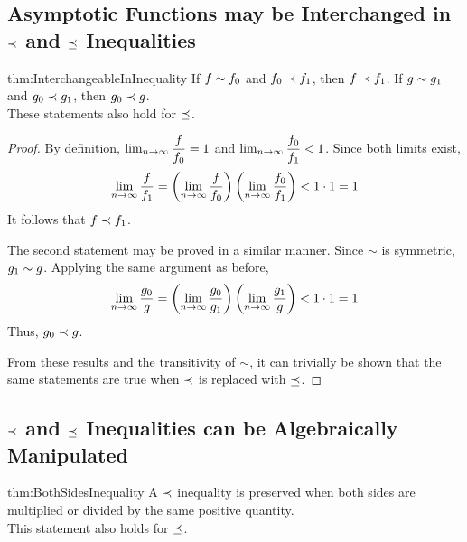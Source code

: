 \subsection{Asymptotic Functions may be Interchanged in $\prec$ and $\preceq$ Inequalities}

\begin{reptheorem}{thm:InterchangeableInInequality}
	If $f \sim f_0$ and $f_0 \prec f_1$, then $f \prec f_1$. If $g \sim g_1$ and $g_0 \prec g_1$, then $g_0 \prec g$.\\
	These statements also hold for $\preceq$.
\end{reptheorem}

\begin{proof}
	By definition, $\lim_{n \to \infty} \dfrac{f}{f_0} = 1$ and $\lim_{n \to \infty} \dfrac{f_0}{f_1} < 1$. Since both limits exist,
	\begin{align*}
	\lim_{n \to \infty} \frac{f}{f_1} = \left( \lim_{n \to \infty} \frac{f}{f_0} \right) \left( \lim_{n \to \infty} \frac{f_0}{f_1} \right) < 1 \cdot 1 = 1
	\end{align*}
	It follows that $f \prec f_1$.
	
	The second statement may be proved in a similar manner. Since $\sim$ is symmetric, $g_1 \sim g$. Applying the same argument as before,
	\begin{align*}
	\lim_{n \to \infty} \frac{g_0}{g} = \left( \lim_{n \to \infty} \frac{g_0}{g_1} \right) \left( \lim_{n \to \infty} \frac{g_1}{g} \right) < 1 \cdot 1 = 1
	\end{align*}
	Thus, $g_0 \prec g$.
	
	From these results and the transitivity of $\sim$, it can trivially be shown that the same statements are true when $\prec$ is replaced with $\preceq$.
\end{proof}

\subsection{$\prec$ and $\preceq$ Inequalities can be Algebraically Manipulated}

\begin{reptheorem}{thm:BothSidesInequality}
	A $\prec$ inequality is preserved when both sides are multiplied or divided by the same positive quantity.\\
	This statement also holds for $\preceq$.
\end{reptheorem}

